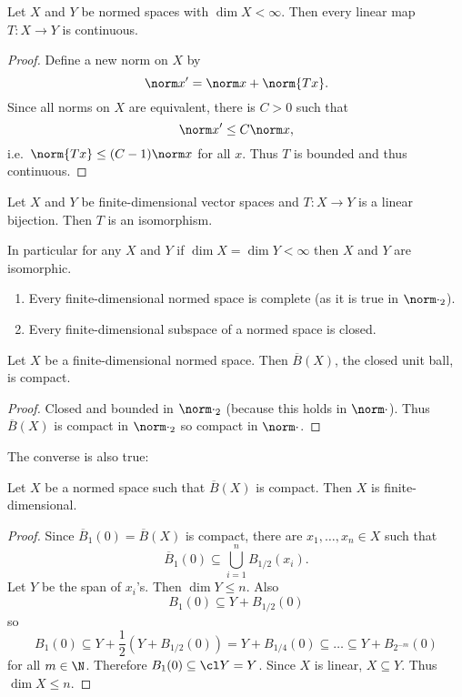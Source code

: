 \documentclass[a4paper]{article}
\begin{document}
\begin{corollary}
  Let \(X\) and \(Y\) be normed spaces with \(\dim X < \infty\). Then every linear map \(T: X \to Y\) is continuous.
\end{corollary}

\begin{proof}
  Define a new norm on \(X\) by
  \[
    \norm x' = \norm x + \norm{T x}.
  \]
  Since all norms on \(X\) are equivalent, there is \(C > 0\) such that
  \[
    \norm x' \leq C \norm x,
  \]
  i.e.\ \(\norm{T x} \leq (C - 1) \norm x\) for all \(x\). Thus \(T\) is bounded and thus continuous.
\end{proof}

\begin{corollary}
  Let \(X\) and \(Y\) be finite-dimensional vector spaces and \(T: X \to Y\) is a linear bijection. Then \(T\) is an isomorphism.

  In particular for any \(X\) and \(Y\) if \(\dim X = \dim Y < \infty\) then \(X\) and \(Y\) are isomorphic.
\end{corollary}

\begin{corollary}\leavevmode
  \begin{enumerate}
  \item Every finite-dimensional normed space is complete (as it is true in \(\norm \cdot_2\)).
  \item Every finite-dimensional subspace of a normed space is closed.
  \end{enumerate}
\end{corollary}

\begin{corollary}
  Let \(X\) be a finite-dimensional normed space. Then \(\overline B(X)\), the closed unit ball, is compact.
\end{corollary}

\begin{proof}
  Closed and bounded in \(\norm \cdot_2\) (because this holds in \(\norm \cdot\)). Thus \(\overline B(X)\) is compact in \(\norm \cdot_2\) so compact in \(\norm \cdot\).
\end{proof}

The converse is also true:
\begin{theorem}
  Let \(X\) be a normed space such that \(\overline B(X)\) is compact. Then \(X\) is finite-dimensional.
\end{theorem}

\begin{proof}
  Since \(\overline B_1(0) = \overline B(X)\) is compact, there are \(x_1, \dots, x_n \in X\) such that
  \[
    \overline B_1(0) \subseteq \bigcup_{i = 1}^n B_{1/2}(x_i).
  \]
  Let \(Y\) be the span of \(x_i\)'s. Then \(\dim Y \leq n\). Also
  \[
    B_1(0) \subseteq Y + B_{1/2}(0)
  \]
  so
  \[
    B_1(0) \subseteq Y + \frac{1}{2} (Y + B_{1/2}(0))
    = Y + B_{1/4}(0)
    \subseteq \dots
    \subseteq Y + B_{2^{-m}}(0)
  \]
  for all \(m \in \N\). Therefore \(B_1(0) \subseteq \cl Y = Y\). Since \(X\) is linear, \(X \subseteq Y\). Thus \(\dim X \leq n\).
\end{proof}
\end{document}

